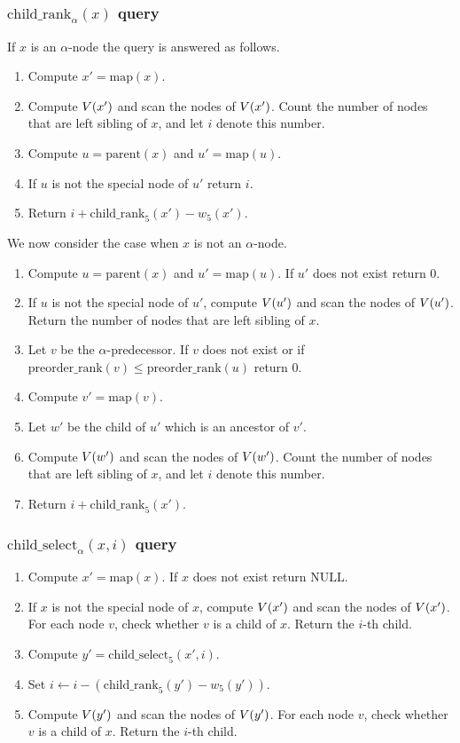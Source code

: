 \documentclass[12pt]{article}
\newcommand{\NULL}{\mathrm{NULL}}
\newcommand{\parentb}{\mathrm{parent}}
\newcommand{\childrankb}{\mathrm{child\_rank}}
\newcommand{\childselectb}{\mathrm{child\_select}}
\newcommand{\preorderrankb}{\mathrm{preorder\_rank}}
\newcommand{\childrank}[2]{\childrankb_{#1}(#2)}
\newcommand{\childselect}[3]{\childselectb_{#1}(#2,#3)}
\newcommand{\parentx}[1]{\parentb(#1)}
\newcommand{\preorderrankx}[1]{\preorderrankb(#1)}
\newcommand{\idxchildren}{5}
\newcommand{\map}[1]{\mathrm{map}(#1)}
\begin{document}
\subsubsection{$\childrank{\alpha}{x}$ query}
If $x$ is an $\alpha$-node the query is answered as follows.
\begin{enumerate}
\item
Compute $x' = \map{x}$.
\item
Compute $V(x')$ and scan the nodes of $V(x')$.
Count the number of nodes that are left sibling of $x$,
and let $i$ denote this number.
\item
Compute $u = \parentx{x}$ and $u' = \map{u}$.
\item
If $u$ is not the special node of $u'$ return $i$.
\item
Return $i + \childrank{\idxchildren}{x'}-w_{\idxchildren}(x')$.
\end{enumerate}
We now consider the case when $x$ is not an $\alpha$-node.
\begin{enumerate}
\item
Compute $u = \parentx{x}$ and $u' = \map{u}$.
If $u'$ does not exist return $0$.
\item
If $u$ is not the special node of $u'$,
compute $V(u')$ and scan the nodes of $V(u')$.
Return the number of nodes that are left sibling of $x$.
\item
Let $v$ be the $\alpha$-predecessor.
If $v$ does not exist or if $\preorderrankx{v} \leq \preorderrankx{u}$
return $0$.
\item
Compute $v'=\map{v}$.
\item
Let $w'$ be the child of $u'$ which is an ancestor of $v'$.
\item
Compute $V(w')$ and scan the nodes of $V(w')$.
Count the number of nodes that are left sibling of $x$,
and let $i$ denote this number.
\item
Return $i + \childrank{\idxchildren}{x'}$.
\end{enumerate}

\subsubsection{$\childselect{\alpha}{x}{i}$ query}
\begin{enumerate}
\item
Compute $x' = \map{x}$.
If $x$ does not exist return $\NULL$.
\item
If $x$ is not the special node of $x$, compute $V(x')$ and scan the nodes of $V(x')$.
For each node $v$, check whether $v$ is a child of $x$.
Return the $i$-th child.
\item
Compute $y'=\childselect{\idxchildren}{x'}{i}$.
\item
Set $i\gets i-(\childrank{\idxchildren}{y'}-w_{\idxchildren}(y'))$.
\item
Compute $V(y')$ and scan the nodes of $V(y')$.
For each node $v$, check whether $v$ is a child of $x$.
Return the $i$-th child.
\end{enumerate}
\end{document}
